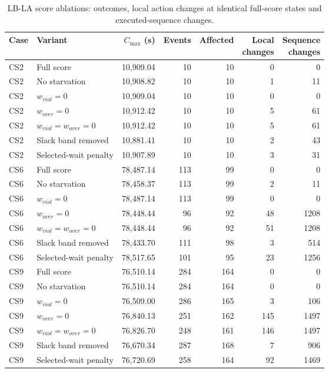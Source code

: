 \begin{table}[tbp]
\caption{LB-LA score ablations: outcomes, local action changes at identical full-score states and executed-sequence changes.\label{tab:ablations}}
\centering
\footnotesize
\setlength{\tabcolsep}{3pt}
\begin{tabular*}{\textwidth}{@{\extracolsep{\fill}}llrrrrr@{}}
\toprule
Case & Variant & \shortstack{$C_{\max}$\\(s)} & Events & Affected & \shortstack{Local\\changes} & \shortstack{Sequence\\changes}\\
\midrule
CS2 & Full score & 10,909.04 & 10 & 10 & 0 & 0\\
CS2 & No starvation & 10,908.82 & 10 & 10 & 1 & 11\\
CS2 & $w_{viol}=0$ & 10,909.04 & 10 & 10 & 0 & 0\\
CS2 & $w_{over}=0$ & 10,912.42 & 10 & 10 & 5 & 61\\
CS2 & $w_{viol}=w_{over}=0$ & 10,912.42 & 10 & 10 & 5 & 61\\
CS2 & Slack band removed & 10,881.41 & 10 & 10 & 2 & 43\\
CS2 & Selected-wait penalty & 10,907.89 & 10 & 10 & 3 & 31\\
CS6 & Full score & 78,487.14 & 113 & 99 & 0 & 0\\
CS6 & No starvation & 78,458.37 & 113 & 99 & 2 & 11\\
CS6 & $w_{viol}=0$ & 78,487.14 & 113 & 99 & 0 & 0\\
CS6 & $w_{over}=0$ & 78,448.44 & 96 & 92 & 48 & 1208\\
CS6 & $w_{viol}=w_{over}=0$ & 78,448.44 & 96 & 92 & 51 & 1208\\
CS6 & Slack band removed & 78,433.70 & 111 & 98 & 3 & 514\\
CS6 & Selected-wait penalty & 78,517.65 & 101 & 95 & 23 & 1256\\
CS9 & Full score & 76,510.14 & 284 & 164 & 0 & 0\\
CS9 & No starvation & 76,510.14 & 284 & 164 & 0 & 0\\
CS9 & $w_{viol}=0$ & 76,509.00 & 286 & 165 & 3 & 106\\
CS9 & $w_{over}=0$ & 76,840.13 & 251 & 162 & 145 & 1497\\
CS9 & $w_{viol}=w_{over}=0$ & 76,826.70 & 248 & 161 & 146 & 1497\\
CS9 & Slack band removed & 76,670.34 & 287 & 168 & 7 & 906\\
CS9 & Selected-wait penalty & 76,720.69 & 258 & 164 & 92 & 1469\\
\bottomrule
\end{tabular*}
\end{table}
